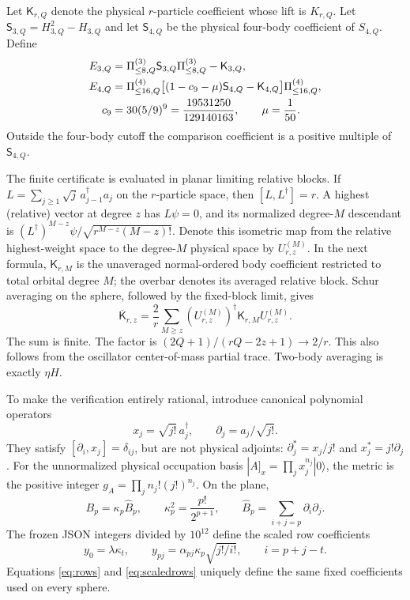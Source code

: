 \documentclass[11pt]{article}
\begin{document}
Let $\mathsf K_{r,Q}$ denote the physical $r$-particle coefficient whose
lift is $K_{r,Q}$. Let
$\mathsf S_{3,Q}=H_{3,Q}^2-H_{3,Q}$ and let $\mathsf S_{4,Q}$ be the
physical four-body coefficient of $S_{4,Q}$. Define
\begin{align}
 E_{3,Q}&=\Pi^{(3)}_{\le8,Q}\mathsf S_{3,Q}\Pi^{(3)}_{\le8,Q}
                    -\mathsf K_{3,Q},\notag\\
 E_{4,Q}&=\Pi^{(4)}_{\le16,Q}
  \big[(1-c_9-\mu)\mathsf S_{4,Q}-\mathsf K_{4,Q}\big]
                  \Pi^{(4)}_{\le16,Q},\label{eq:finiteE}\\
 c_9&=30(5/9)^9=\frac{19531250}{129140163},\qquad \mu=\frac1{50}.
\end{align}
Outside the four-body cutoff the comparison coefficient is a
positive multiple of $\mathsf S_{4,Q}$.

The finite certificate is evaluated in planar limiting relative blocks.
If $L=\sum_{j\ge1}\sqrt j\,a_{j-1}^\dagger a_j$ on the $r$-particle
space, then $[L,L^\dagger]=r$. A highest (relative) vector at degree $z$
has $L\psi=0$, and its normalized degree-$M$ descendant is
$(L^\dagger)^{M-z}\psi/\sqrt{r^{M-z}(M-z)!}$.
Denote this isometric map from the relative highest-weight space to the
degree-$M$ physical space by $U_{r,z}^{(M)}$. In the next formula,
$\mathsf K_{r,M}$ is the unaveraged normal-ordered body coefficient
restricted to total orbital degree $M$; the overbar denotes its averaged
relative block.
Schur averaging on the sphere, followed by the fixed-block limit, gives
\begin{equation}\label{eq:average-formula}
 \overline{\mathsf K}_{r,z}
 =\frac2r\sum_{M\ge z}
 (U_{r,z}^{(M)})^\dagger\mathsf K_{r,M}U_{r,z}^{(M)}.
\end{equation}
The sum is finite. The factor is
$(2Q+1)/(rQ-2z+1)\to2/r$. This also follows from the oscillator
center-of-mass partial trace. Two-body averaging is exactly $\eta H$.

To make the verification entirely rational, introduce canonical polynomial
operators
\begin{equation}
 x_j=\sqrt{j!}\,a_j^\dagger,\qquad \partial_j=a_j/\sqrt{j!}.
\end{equation}
They satisfy $[\partial_i,x_j]=\delta_{ij}$, but are not physical adjoints:
$\partial_j^*=x_j/j!$ and $x_j^*=j!\partial_j$.
For the unnormalized physical occupation basis
$|A]_x=\prod_jx_j^{n_j}|0\rangle$, the metric is the positive integer
$g_A=\prod_jn_j!(j!)^{n_j}$. On the plane,
\begin{equation}
 B_p=\kappa_p\widehat B_p,\qquad
 \kappa_p^2=\frac{p!}{2^{p+1}},\qquad
 \widehat B_p=\sum_{i+j=p}\partial_i\partial_j.
\end{equation}
The frozen JSON integers divided by $10^{12}$ define the scaled row
coefficients
\begin{equation}\label{eq:scaledrows}
 y_0=\lambda\kappa_t,\qquad
 y_{pj}=\alpha_{pj}\kappa_p\sqrt{j!/i!},\qquad i=p+j-t.
\end{equation}
Equations \eqref{eq:rows} and \eqref{eq:scaledrows} uniquely define the
same fixed coefficients used on every sphere.
\end{document}
